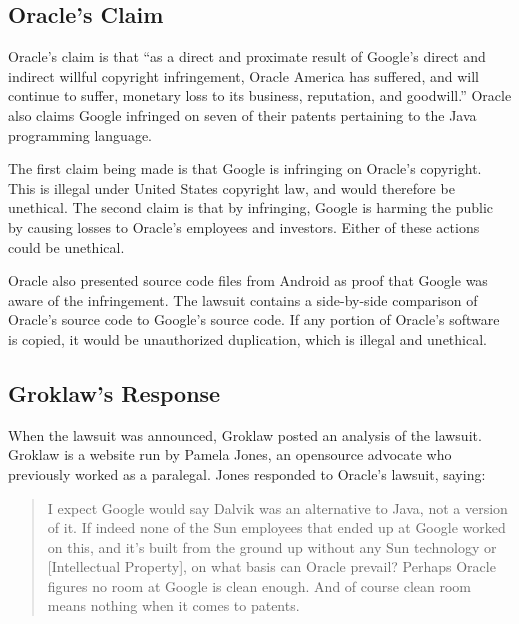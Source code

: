 \documentclass[11pt]{article}
\begin{document}
\begin{multicols}{2}
\subsection{Oracle's Claim} %
\label{sub:args_oracle}

Oracle's claim is that ``as a direct and proximate result of Google's direct
and indirect willful copyright infringement, Oracle America has suffered, and
will continue to suffer, monetary loss to its business, reputation, and
goodwill.'' \cite[p.~9 line 11]{oracle-lawsuit}  Oracle also claims Google
infringed on seven of their patents pertaining to the Java programming language.

The first claim being made is that Google is infringing on Oracle's copyright.
This is illegal under United States copyright law, and would therefore be
unethical.  The second claim is that by infringing, Google is harming the public
by causing losses to Oracle's employees and investors.  Either of these actions
could be unethical.

Oracle also presented source code files from Android as proof that Google was
aware of the infringement.  The lawsuit contains a side-by-side comparison of
Oracle's source code to Google's source code. \cite{exhibitj} If any portion of
Oracle's software is copied, it would be unauthorized duplication, which is
illegal and unethical.


\subsection{Groklaw's Response} %
\label{sub:args_groklaw}

When the lawsuit was announced, Groklaw posted an analysis of the lawsuit.
Groklaw is a website run by Pamela Jones, an \gls{opensource} advocate who
previously worked as a paralegal. \cite{groklaw-pj} Jones responded to Oracle's
lawsuit, saying: \cite{groklaw}

\begin{quotation}
I expect Google would say Dalvik was an alternative to Java, not a version of
it. If indeed none of the Sun employees that ended up at Google worked on this,
and it's built from the ground up without any Sun technology or [Intellectual
Property], on what basis can Oracle prevail? Perhaps Oracle figures no room at
Google is clean enough. And of course clean room means nothing when it comes to
patents.
\end{quotation}


\end{multicols}
\end{document}

